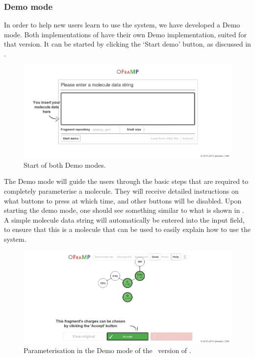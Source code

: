 \subsubsection{Demo mode}
In order to help new users learn to use the system, we have developed a Demo mode. Both implementations of \oframp{} have their own Demo implementation, suited for that version. It can be started by clicking the `Start demo' button, as discussed in .

\begin{figure}
\center
\includegraphics[width=.9\textwidth]{img/demo_1.png}
\caption{Start of both Demo modes.}
\end{figure}

The Demo mode will guide the users through the basic steps that are required to completely parameterise a molecule. They will receive detailed instructions on what buttons to press at which time, and other buttons will be disabled. Upon starting the demo mode, one should see something similar to what is shown in . A simple molecule data string will automatically be entered into the input field, to ensure that this is a molecule that can be used to easily explain how to use the system.

\begin{figure}
\center
\includegraphics[width=.9\textwidth]{img/demo_2.png}
\caption{Parameterisation in the Demo mode of the \IDb\ version of \oframp{}.}
\end{figure}

